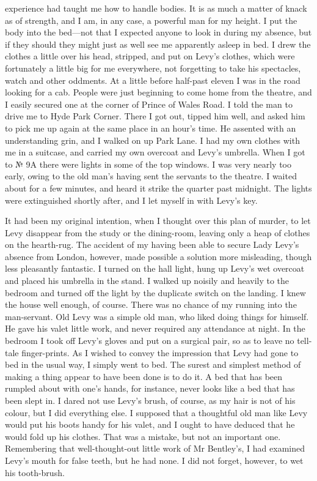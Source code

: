 experience had taught me how to handle bodies. It is as much a matter of knack as of strength, and I am, in any case, a powerful man for my height. I put the body into the bed—not that I expected anyone to look in during my absence, but if they should they might just as well see me apparently asleep in bed. I drew the clothes a little over his head, stripped, and put on Levy's clothes, which were fortunately a little big for me everywhere, not forgetting to take his spectacles, watch and other oddments. At a little before half-past eleven I was in the road looking for a cab. People were just beginning to come home from the theatre, and I easily secured one at the corner of Prince of Wales Road. I told the man to drive me to Hyde Park Corner. There I got out, tipped him well, and asked him to pick me up again at the same place in an hour's time. He assented with an understanding grin, and I walked on up Park Lane. I had my own clothes with me in a suitcase, and carried my own overcoat and Levy's umbrella. When I got to № 9A there were lights in some of the top windows. I was very nearly too early, owing to the old man's having sent the servants to the theatre. I waited about for a few minutes, and heard it strike the quarter past midnight. The lights were extinguished shortly after, and I let myself in with Levy's key.

It had been my original intention, when I thought over this plan of murder, to let Levy disappear from the study or the dining-room, leaving only a heap of clothes on the hearth-rug. The accident of my having been able to secure Lady Levy's absence from London, however, made possible a solution more misleading, though less pleasantly fantastic. I turned on the hall light, hung up Levy's wet overcoat and placed his umbrella in the stand. I walked up noisily and heavily to the bedroom and turned off the light by the duplicate switch on the landing. I knew the house well enough, of course. There was no chance of my running into the man-servant. Old Levy was a simple old man, who liked doing things for himself. He gave his valet little work, and never required any attendance at night. In the bedroom I took off Levy's gloves and put on a surgical pair, so as to leave no tell-tale finger-prints. As I wished to convey the impression that Levy had gone to bed in the usual way, I simply went to bed. The surest and simplest method of making a thing appear to have been done is to do it. A bed that has been rumpled about with one's hands, for instance, never looks like a bed that has been slept in. I dared not use Levy's brush, of course, as my hair is not of his colour, but I did everything else. I supposed that a thoughtful old man like Levy would put his boots handy for his valet, and I ought to have deduced that he would fold up his clothes. That was a mistake, but not an important one. Remembering that well-thought-out little work of Mr Bentley's, I had examined Levy's mouth for false teeth, but he had none. I did not forget, however, to wet his tooth-brush.

